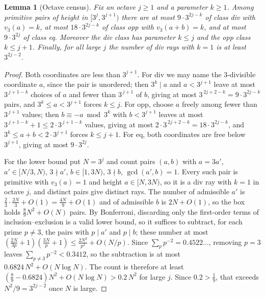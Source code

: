 \documentclass[11pt]{amsart}
\newtheorem{lemma}[theorem]{Lemma}
\theoremstyle{definition}
\theoremstyle{remark}
\begin{document}
\begin{lemma}[Octave census]
\label{lem:census}
Fix an octave $j \ge 1$ and a parameter $k \ge 1$. Among primitive pairs of height in $[3^j, 3^{j+1})$ there are at most $9 \cdot 3^{2j-k}$ of class div with $v_3(a) = k$, at most $18 \cdot 3^{2j-k}$ of class opp with $v_3(a+b) = k$, and at most $9 \cdot 3^{2j}$ of class eq. Moreover the div class has parameter $k \le j$ and the opp class $k \le j+1$. Finally, for all large $j$ the number of div rays with $k = 1$ is at least $3^{2j-2}$.
\end{lemma}

\begin{proof}
Both coordinates are less than $3^{j+1}$. For div we may name the $3$-divisible coordinate $a$, since the pair is unordered; then $3^k \mid a$ and $a < 3^{j+1}$ leave at most $3^{\,j+1-k}$ choices of $a$ and fewer than $3^{\,j+1}$ of $b$, giving at most $3^{\,2j+2-k} = 9 \cdot 3^{2j-k}$ pairs, and $3^k \le a < 3^{j+1}$ forces $k \le j$. For opp, choose $a$ freely among fewer than $3^{\,j+1}$ values; then $b \equiv -a \bmod 3^k$ with $b < 3^{j+1}$ leaves at most $3^{\,j+1-k} + 1 \le 2 \cdot 3^{\,j+1-k}$ values, giving at most $2 \cdot 3^{\,2j+2-k} = 18 \cdot 3^{2j-k}$, and $3^k \le a+b < 2 \cdot 3^{j+1}$ forces $k \le j+1$. For eq, both coordinates are free below $3^{j+1}$, giving at most $9 \cdot 3^{2j}$.

For the lower bound put $N = 3^j$ and count pairs $(a,b)$ with $a = 3a'$, $a' \in [N/3, N)$, $3 \nmid a'$, $b \in [1, 3N)$, $3 \nmid b$, $\gcd(a', b) = 1$. Every such pair is primitive with $v_3(a) = 1$ and height $a \in [N, 3N)$, so it is a div ray with $k = 1$ in octave $j$, and distinct pairs give distinct rays. The number of admissible $a'$ is $\tfrac23 \cdot \tfrac{2N}{3} + O(1) = \tfrac{4N}{9} + O(1)$ and of admissible $b$ is $2N + O(1)$, so the box holds $\tfrac{8}{9}N^2 + O(N)$ pairs. By Bonferroni, discarding only the first-order terms of inclusion--exclusion is a valid lower bound, so it suffices to subtract, for each prime $p \ne 3$, the pairs with $p \mid a'$ and $p \mid b$; these number at most $(\tfrac{2N}{3p}+1)(\tfrac{3N}{p}+1) \le \tfrac{2N^2}{p^2} + O(N/p)$. Since $\sum_p p^{-2} = 0.4522\ldots$, removing $p = 3$ leaves $\sum_{p \ne 3} p^{-2} < 0.3412$, so the subtraction is at most $0.6824\,N^2 + O(N\log N)$. The count is therefore at least $(\tfrac89 - 0.6824)N^2 + O(N \log N) > 0.2\,N^2$ for large $j$. Since $0.2 > \tfrac19$, that exceeds $N^2/9 = 3^{2j-2}$ once $N$ is large.
\end{proof}
\end{document}
